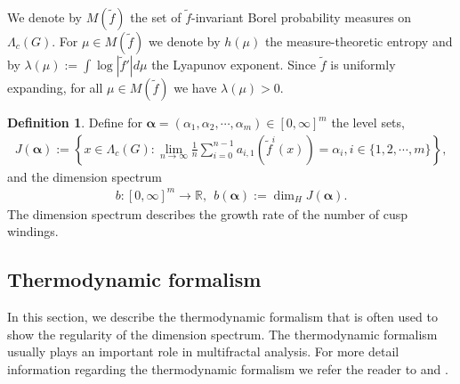 \documentclass{article}
\theoremstyle{definition}
\newtheorem{definition}[thm]{Definition}
\begin{document}
   We denote by $M({\tilde f})$ the set of $\tilde f$-invariant 
Borel probability measures on $\Lambda_c(G)$. For $\mu\in M(\tilde f)$ we denote by $h(\mu)$ the measure-theoretic entropy and by $\lambda(\mu):=\int \log|\tilde f'| d \mu$ the Lyapunov exponent. Since $\tilde f$ is uniformly expanding, for all $\mu\in M(\tilde f)$ we have $\lambda(\mu)>0$. 




   
\begin{definition}
    Define for $\boldsymbol{\alpha}=(\alpha_1, \alpha_2,\cdots,\alpha_m) \in [0,\infty]^m$ the level sets,
    \begin{align}
    J(\boldsymbol{\alpha}):=\left\{ x \in \Lambda_c(G):\lim_{n\to \infty}\frac{1}{n}\sum_{i=0}^{n-1}a_{i,1}(\tilde f^{i}(x)) = {\alpha_i},i\in\lbrace1,2,\cdots,m\rbrace \right\},\nonumber
    \end{align}
    and the dimension spectrum 
\begin{align}
   b:[0,\infty]^m\rightarrow\mathbb{R},\ \ b(\boldsymbol{\alpha}):=\dim_HJ(\boldsymbol{\alpha}).\nonumber
\end{align}
 The dimension spectrum describes the growth rate of the number of cusp windings.
\end{definition}



\subsection{Thermodynamic formalism}
In this section, we describe the thermodynamic formalism that is often used to show the regularity of the dimension spectrum. The thermodynamic formalism usually plays an important role in multifractal analysis. For more detail information regarding the thermodynamic formalism we refer the reader to \cite[Section 2]{mauldin2003graph} and \cite[section 17]{urubanskinoninvertible}.
\end{document}
